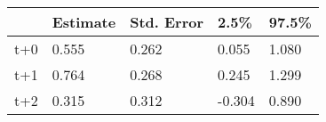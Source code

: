 \begin{tabular}{lllll}
  \toprule
  & Estimate & Std. Error & 2.5\% & 97.5\% \\ 
  \midrule
t+0 & 0.555 & 0.262 & 0.055 & 1.080 \\ 
  t+1 & 0.764 & 0.268 & 0.245 & 1.299 \\ 
  t+2 & 0.315 & 0.312 & -0.304 & 0.890 \\ 
   \bottomrule
\end{tabular}
